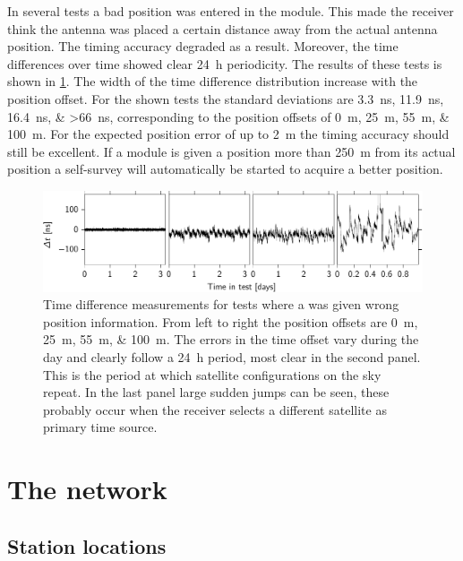 In several tests a bad position was entered in the \gps module. This made the \gps receiver think the \gps antenna was placed a certain distance away from the actual antenna position. The timing accuracy degraded as a result. Moreover, the time differences over time showed clear \SI{24}{\hour} periodicity. The results of these tests is shown in \cref{fig:tt_delta_time_89_22_44_3}. The width of the time difference distribution increase with the position offset. For the shown tests the standard deviations are \SIlist{3.3;11.9;16.4;>66}{\ns}, corresponding to the position offsets of \SIlist{0;25;55;100}{\meter}. For the expected position error of up to \SI{2}{\meter} the timing accuracy should still be excellent. If a \gps module is given a position more than \SI{250}{\meter} from its actual position a self-survey will automatically be started to acquire a better position.

\begin{figure}
    \centering
    \includegraphics[width=\textwidth]
                    {plots/cluster/tt_delta_time_89_22_44_3}
    \caption{Time difference measurements for tests where a \gps was given wrong position information. From left to right the position offsets are \SIlist{0;25;55;100}{\meter}. The errors in the time offset vary during the day and clearly follow a \SI{24}{\hour} period, most clear in the second panel. This is the period at which \gps satellite configurations on the sky repeat. In the last panel large sudden jumps can be seen, these probably occur when the \gps receiver selects a different \gps satellite as primary time source.}
    \label{fig:tt_delta_time_89_22_44_3}
\end{figure}


\section{The \hisparc network}

\subsection{Station locations}

